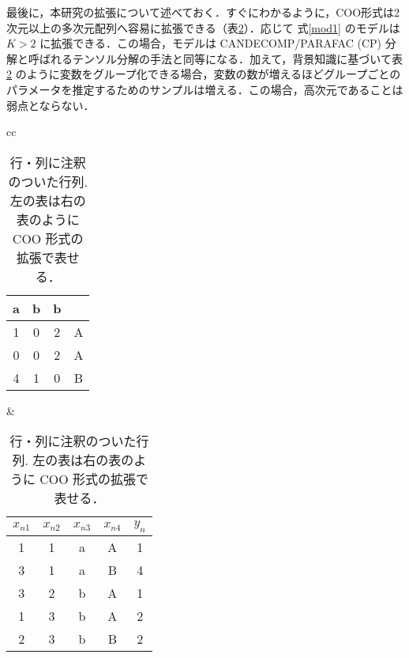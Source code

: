\documentclass[paper=a4,10.5pt]{jsarticle} %
\numberwithin{equation}{section} %
\begin{document}
最後に，本研究の拡張について述べておく．すぐにわかるように，COO形式は2次元以上の多次元配列へ容易に拡張できる（表\ref{tab2}）．応じて 式\eqref{mod1} のモデルは $K>2$ に拡張できる．この場合，モデルは CANDECOMP/PARAFAC (CP) 分解と呼ばれるテンソル分解の手法と同等になる．加えて，背景知識に基づいて表\ref{tab2} のように変数をグループ化できる場合，変数の数が増えるほどグループごとのパラメータを推定するためのサンプルは増える．この場合，高次元であることは弱点とならない．

\begin{table}[tbp]
\centering
\caption{行・列に注釈のついた行列. 左の表は右の表のように COO 形式の拡張で表せる．}\label{tab2}
\begin{tabular}{cc}
\begin{minipage}{0.22\textwidth}
\centering
\begin{tabular}{|ccc|c|}
\hline
 a & b & b & \\
\hline
 1 & 0 & 2 &A \\
 0 & 0 & 2 &A\\
 4 & 1 & 0 &B\\
\hline
\end{tabular}
\end{minipage}
&
\begin{minipage}{0.22\textwidth}
\centering
\begin{tabular}{ccccc}
\hline
$x_{n1}$ & $x_{n2}$& $x_{n3}$ & $x_{n4}$ & $y_n$\\
\hline
1 & 1 &a & A & 1\\
3 & 1 & a & B & 4\\
3 & 2 & b & A& 1\\
1 & 3 & b & A& 2\\
2 & 3 & b & B& 2\\
\hline
\end{tabular}
\end{minipage}
\end{tabular}
\end{table}


%
%

\end{document}
